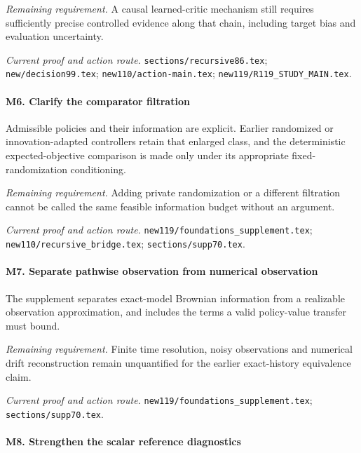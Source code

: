 \par\emph{Remaining requirement.} A causal learned-critic mechanism still requires sufficiently precise controlled evidence along that chain, including target bias and evaluation uncertainty.

\par\emph{Current proof and action route.} \nolinkurl{sections/recursive86.tex}; \nolinkurl{new/decision99.tex}; \nolinkurl{new110/action-main.tex}; \nolinkurl{new119/R119_STUDY_MAIN.tex}.

\paragraph{M6. Clarify the comparator filtration}

Admissible policies and their information are explicit. Earlier randomized or innovation-adapted controllers retain that enlarged class, and the deterministic expected-objective comparison is made only under its appropriate fixed-randomization conditioning.

\par\emph{Remaining requirement.} Adding private randomization or a different filtration cannot be called the same feasible information budget without an argument.

\par\emph{Current proof and action route.} \nolinkurl{new119/foundations_supplement.tex}; \nolinkurl{new110/recursive_bridge.tex}; \nolinkurl{sections/supp70.tex}.

\paragraph{M7. Separate pathwise observation from numerical observation}

The supplement separates exact-model Brownian information from a realizable observation approximation, and includes the terms a valid policy-value transfer must bound.

\par\emph{Remaining requirement.} Finite time resolution, noisy observations and numerical drift reconstruction remain unquantified for the earlier exact-history equivalence claim.

\par\emph{Current proof and action route.} \nolinkurl{new119/foundations_supplement.tex}; \nolinkurl{sections/supp70.tex}.

\paragraph{M8. Strengthen the scalar reference diagnostics}

